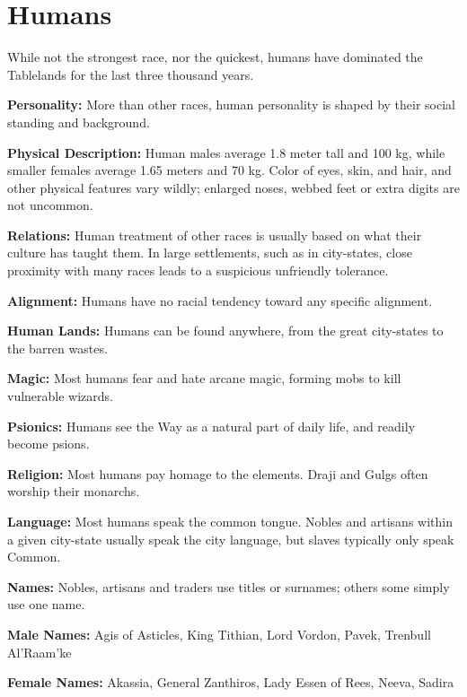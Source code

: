 \section{Humans}

While not the strongest race, nor the quickest, humans have dominated the Tablelands for the last three thousand years.

\textbf{Personality:} More than other races, human personality is shaped by their social standing and background.

\textbf{Physical Description:} Human males average 1.8 meter tall and 100 kg, while smaller females average 1.65 meters and 70 kg. Color of eyes, skin, and hair, and other physical features vary wildly; enlarged noses, webbed feet or extra digits are not uncommon.

\textbf{Relations:} Human treatment of other races is usually based on what their culture has taught them. In large settlements, such as in city-states, close proximity with many races leads to a suspicious unfriendly tolerance.

\textbf{Alignment:} Humans have no racial tendency toward any specific alignment.

\textbf{Human Lands:} Humans can be found anywhere, from the great city-states to the barren wastes.

\textbf{Magic:} Most humans fear and hate arcane magic, forming mobs to kill vulnerable wizards.

\textbf{Psionics:} Humans see the Way as a natural part of daily life, and readily become psions.

\textbf{Religion:} Most humans pay homage to the elements. Draji and Gulgs often worship their monarchs.

\textbf{Language:} Most humans speak the common tongue. Nobles and artisans within a given city-state usually speak the city language, but slaves typically only speak Common.

\textbf{Names:} Nobles, artisans and traders use titles or surnames; others some simply use one name.

\textbf{Male Names:} Agis of Asticles, King Tithian, Lord Vordon, Pavek, Trenbull Al'Raam'ke

\textbf{Female Names:} Akassia, General Zanthiros, Lady Essen of Rees, Neeva, Sadira

